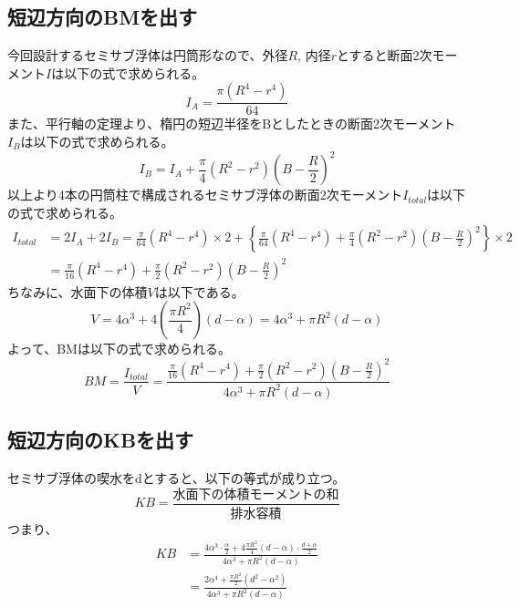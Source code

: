\documentclass[11pt, dvipdfmx]{jsarticle}
\begin{document}
\subsection{短辺方向のBMを出す}
今回設計するセミサブ浮体は円筒形なので、外径$R$, 内径$r$とすると断面2次モーメント$I$は以下の式で求められる。
\begin{equation}
    I_A = \frac{\pi (R^4-r^4)}{64}
\end{equation}
また、平行軸の定理より、楕円の短辺半径をBとしたときの断面2次モーメント$I_B$は以下の式で求められる。
\begin{equation}
    I_B = I_A + \frac{\pi}{4}(R^2 - r^2)(B-\frac{R}{2})^2
\end{equation}
以上より4本の円筒柱で構成されるセミサブ浮体の断面2次モーメント$I_{total}$は以下の式で求められる。
\begin{align}
    I_{total} &= 2 I_A + 2 I_B = \frac{\pi}{64}(R^4 - r^4)\times 2 + \left\{\frac{\pi}{64}(R^4 - r^4) + \frac{\pi}{4}(R^2 - r^2) (B-\frac{R}{2})^2 \right\}\times 2\\ 
    &= \frac{\pi}{16}(R^4 - r^4) + \frac{\pi}{2}(R^2 - r^2) (B-\frac{R}{2})^2
\end{align}
ちなみに、水面下の体積$V$は以下である。
\begin{equation}
    V = 4\alpha^3 + 4 \left( \frac{\pi R^2}{4} \right) (d-\alpha) = 4\alpha^3 + \pi R^2 (d-\alpha)
\end{equation}
よって、BMは以下の式で求められる。
\begin{equation}
    BM = \frac{I_{total}}{V} = \frac{\frac{\pi}{16}(R^4 - r^4) + \frac{\pi}{2}(R^2 - r^2) (B-\frac{R}{2})^2}{4\alpha^3 + \pi R^2 (d-\alpha)}
\end{equation}




\subsection{短辺方向のKBを出す}
セミサブ浮体の喫水をdとすると、以下の等式が成り立つ。
$$KB = \frac{水面下の体積モーメントの和}{排水容積}$$
つまり、
\begin{align}
    KB &= \frac{4\alpha^3\cdot \frac{\alpha}{2} + 4\frac{\pi R^2}{4}(d-\alpha)\cdot \frac{d+\alpha}{2}}{4\alpha^3 + \pi R^2(d-\alpha)}\\
    &= \frac{2\alpha^4 + \frac{\pi R^2}{2}(d^2 - \alpha^2)}{4\alpha^3 + \pi R^2(d-\alpha)}
\end{align}
\end{document}
